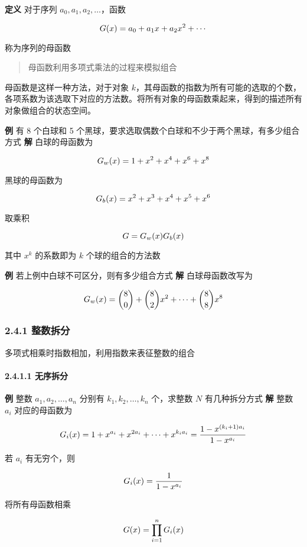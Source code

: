 \textbf{定义} 对于序列 \(a_0,a_1,a_2,…\)，函数

\[
\huge G(x)=a_0+a_1x+a_2x^2+\cdots
\]

称为序列的母函数

\begin{quote}
母函数利用多项式乘法的过程来模拟组合
\end{quote}

母函数是这样一种方法，对于对象
\(k\)，其母函数的指数为所有可能的选取的个数，各项系数为该选取下对应的方法数。将所有对象的母函数乘起来，得到的描述所有对象做组合的状态空间。

\textbf{例} 有 8 个白球和 5
个黑球，要求选取偶数个白球和不少于两个黑球，有多少组合方式 \textbf{解}
白球的母函数为

\[
\huge G_w(x)=1+x^2+x^4+x^6+x^8
\]

黑球的母函数为

\[
\huge G_b(x)=x^2+x^3+x^4+x^5+x^6
\]

取乘积

\[
\huge G=G_w(x)G_b(x)
\]

其中 \(x^k\) 的系数即为 \(k\) 个球的组合的方法数

\textbf{例} 若上例中白球不可区分，则有多少组合方式 \textbf{解}
白球母函数改写为

\[
\huge G_w(x)=\binom{8}{0}+\binom{8}{2}x^2+\cdots+\binom{8}{8}x^8
\]

\subsubsection{2.4.1 整数拆分}\label{ux6574ux6570ux62c6ux5206}

多项式相乘时指数相加，利用指数来表征整数的组合

\paragraph{2.4.1.1 无序拆分}\label{ux65e0ux5e8fux62c6ux5206}

\textbf{例} 整数 \(a_1,a_2,…,a_n\) 分别有 \(k_1,k_2,…,k_n\) 个，求整数
\(N\) 有几种拆分方式 \textbf{解} 整数 \(a_i\) 对应的母函数为

\[
\huge G_i(x)=1+x^{a_i}+x^{2a_i}+\cdots+x^{k_ia_i}=\dfrac{1-x^{(k_i+1)a_i}}{1-x^{a_i}}
\]

若 \(a_i\) 有无穷个，则

\[
\huge G_i(x)=\dfrac{1}{1-x^{a_i}}
\]

将所有母函数相乘

\[
\huge G(x)=\prod_{i=1}^n{G_i(x)}
\]

